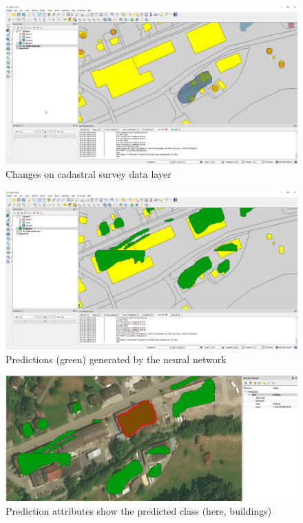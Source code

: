 \begin{figure}[H]
    \centering
	\includegraphics[width=1\linewidth]{chapters/practical_results/images/qgis_changes.png}
	\caption{Changes on cadastral survey data layer}
	\label{fig:plugin:changes_cadastral_layer}
\end{figure}

\begin{figure}[H]
    \centering
	\includegraphics[width=1\linewidth]{chapters/practical_results/images/qgis_predictions.png}
	\caption{Predictions (green) generated by the neural network}
	\label{fig:plugin:predictions}
\end{figure}

\begin{figure}[H]
    \centering
	\includegraphics[width=1\linewidth]{chapters/practical_results/images/qgis_prediction_attributes.png}
	\caption{Prediction attributes show the predicted class (here, buildings)}
	\label{fig:plugin:prediction_attributes}
\end{figure}


